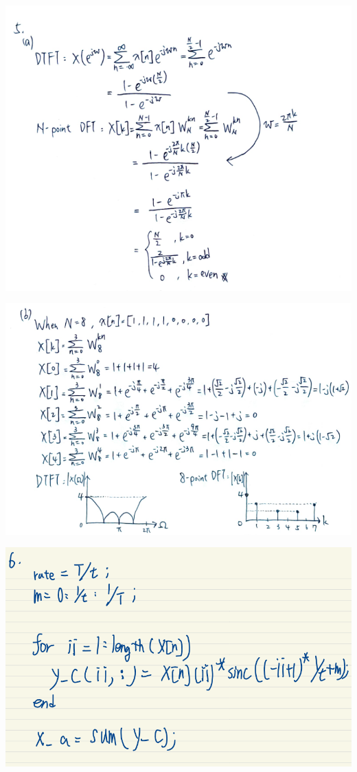 \documentclass[a4paper]{article}
\begin{document}
	\begin{center}
		\includegraphics[width=1\linewidth]{screenshot131}
	\end{center}
	\begin{center}
		\includegraphics[width=1\linewidth]{screenshot132}
	\end{center}
	\begin{center}
		\includegraphics[width=1\linewidth]{screenshot133}
	\end{center}
	
	
	
	
\end{document}
